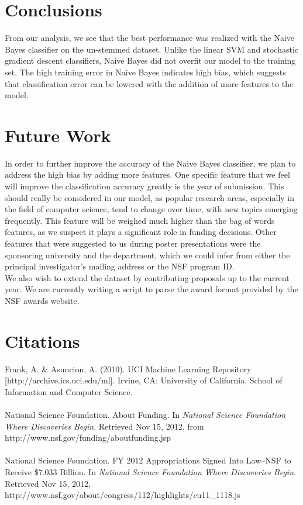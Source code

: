 \documentclass{sig-alternate}
\begin{document}
\section{Conclusions}
From our analysis, we see that the best performance was realized with the Naive Bayes classifier on the un-stemmed dataset.  Unlike the linear SVM and stochastic gradient descent classifiers, Naive Bayes did not overfit our model to the training set.  The high training error in Naive Bayes indicates high bias, which suggests that classification error can be lowered with the addition of more features to the model.

\section{Future Work}
In order to further improve the accuracy of the Naive Bayes classifier, we plan to address the high bias by adding more features.  One specific feature that we feel will improve the classification accuracy greatly is the year of submission.  This should really be considered in our model, as popular research areas, especially in the field of computer science, tend to change over time, with new topics emerging frequently.  This feature will be weighed much higher than the bag of words features, as we suspect it plays a significant role in funding decisions.  Other features that were suggested to us during poster presentations were the sponsoring university and the department, which we could infer from either the principal investigator’s mailing address or the NSF program ID.\\

We also wish to extend the dataset by contributing proposals up to the current year.  We are currently writing a script to parse the award format provided by the NSF awards website.

\section{Citations}
\noindent
[1] Frank, A. \& Asuncion, A. (2010). UCI Machine Learning Repository [http://archive.ics.uci.edu/ml]. Irvine, CA: University of California, School of Information and Computer Science. \\ \\
\noindent
[2] National Science Foundation.  About Funding. In {\it National Science Foundation Where Discoveries Begin}. Retrieved Nov 15, 2012, from http://www.nsf.gov/funding/aboutfunding.jsp \\ \\
\noindent
[3] National Science Foundation. FY 2012 Appropriations Signed Into Law--NSF to Receive \$7.033 Billion. In {\it National Science Foundation Where Discoveries Begin}. Retrieved Nov 15, 2012, http://www.nsf.gov/about/congress/112/highlights/cu11\_1118.js\\ \\
\end{document}
